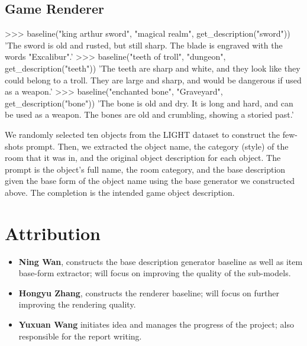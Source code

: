 \documentclass[12pt]{article}
\begin{document}
  \subsection{Game Renderer}
    \begin{python}
          
      >>> baseline("king arthur sword", "magical realm", get_description("sword"))
      'The sword is old and rusted, but still sharp. The blade is engraved with the words "Excalibur".'
      >>> baseline("teeth of troll", "dungeon", get_description("teeth"))
      'The teeth are sharp and white, and they look like they could belong to a troll. They are large and sharp, and would be dangerous if used as a weapon.'
      >>> baseline("enchanted bone", "Graveyard", get_description("bone"))
      'The bone is old and dry. It is long and hard, and can be used as a weapon. The bones are old and crumbling, showing a storied past.'
    \end{python}

    We randomly selected ten objects from the LIGHT dataset to construct the few-shots prompt. Then, we extracted the object name, 
      the category (style) of the room that it was in, and the original object description for each object. The prompt is the 
      object's full name, the room category, and the base description given the base form of the object name using the base 
      generator we constructed above. The completion is the intended game object description.

\section{Attribution}
  \begin{itemize}
    \item \textbf{Ning Wan}, constructs the base description generator baseline as well as item base-form extractor; will focus on improving the quality of the sub-models. 
    \item \textbf{Hongyu Zhang}, constructs the renderer baseline; will focus on further improving the rendering quality.
    \item \textbf{Yuxuan Wang} initiates idea and manages the progress of the project; also responsible for the report writing.  
  \end{itemize}




\end{document}
